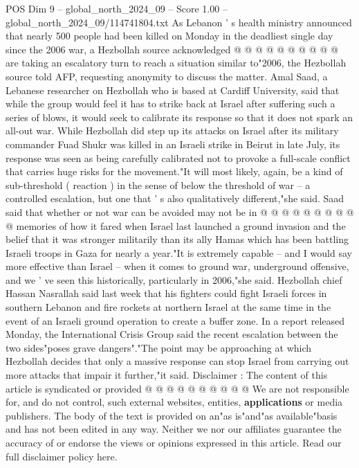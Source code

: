 \begin{textsample}{POS Dim 9 – global\_north\_2024\_09 – Score 1.00 – global\_north\_2024\_09/114741804.txt}
As Lebanon ' s health ministry announced that nearly 500 people had been killed on Monday in the deadliest single day since the 2006 war, a Hezbollah source acknowledged @ @ @ @ @ @ @ @ @ @ are taking an escalatory turn to reach a situation similar to"2006, the Hezbollah source told AFP, requesting anonymity to discuss the matter.
Amal Saad, a Lebanese researcher on Hezbollah who is based at Cardiff University, said that while the group would feel it has to strike back at Israel after suffering such a series of blows, it would seek to calibrate its response so that it does not spark an all-out war.
While Hezbollah did step up its attacks on Israel after its military commander Fuad Shukr was killed in an Israeli strike in Beirut in late July, its response was seen as being carefully calibrated not to provoke a full-scale conflict that carries huge risks for the movement."It will most likely, again, be a kind of sub-threshold ( reaction ) in the sense of below the threshold of war -- a controlled escalation, but one that ' s also qualitatively different,"she said.
Saad said that whether or not war can be avoided may not be in @ @ @ @ @ @ @ @ @ @ memories of how it fared when Israel last launched a ground invasion and the belief that it was stronger militarily than its ally Hamas which has been battling Israeli troops in Gaza for nearly a year."It is extremely capable -- and I would say more effective than Israel -- when it comes to ground war, underground offensive, and we ' ve seen this historically, particularly in 2006,"she said.
Hezbollah chief Hassan Nasrallah said last week that his fighters could fight Israeli forces in southern Lebanon and fire rockets at northern Israel at the same time in the event of an Israeli ground operation to create a buffer zone.
In a report released Monday, the International Crisis Group said the recent escalation between the two sides"poses grave dangers"."The point may be approaching at which Hezbollah decides that only a massive response can stop Israel from carrying out more attacks that impair it further,"it said.
Disclaimer : The content of this article is syndicated or provided @ @ @ @ @ @ @ @ @ @ We are not responsible for, and do not control, such external websites, entities, \textbf{applications} or media publishers.
The body of the text is provided on an"as is"and"as available"basis and has not been edited in any way.
Neither we nor our affiliates guarantee the accuracy of or endorse the views or opinions expressed in this article.
Read our full disclaimer policy here.

\end{textsample}
